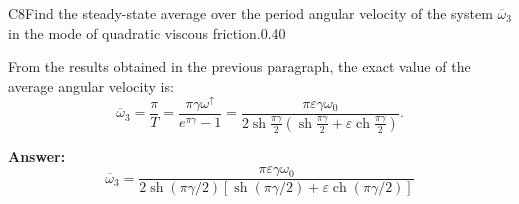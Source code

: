 \documentclass[11pt,a4paper]{article}
\begin{document}
\begin{solcard}{C8}{Find the steady-state average over the period angular velocity of the system $\overline\omega_3$ in the mode of quadratic viscous friction.}{0.40}

From the results obtained in the previous paragraph, the exact value of the average angular velocity is: \[\overline\omega_3=\frac{\pi}T=\frac{\pi\gamma\omega^\uparrow}{e^{\pi\gamma}-1}=\frac{\pi\varepsilon\gamma\omega_0}{2\operatorname{sh}\frac{\pi\gamma}2\left(\operatorname{sh}\frac{\pi\gamma}2+\varepsilon\operatorname{ch}\frac{\pi\gamma}2\right)}.\]

\par\smallskip\noindent\textbf{Answer:} \[\overline\omega_3=\frac{\pi\varepsilon\gamma\omega_0}{2\operatorname{sh}(\pi\gamma/2)\left[\operatorname{sh}(\pi\gamma/2)+\varepsilon\operatorname{ch}(\pi\gamma/2)\right]}\]
\end{solcard}
\end{document}
